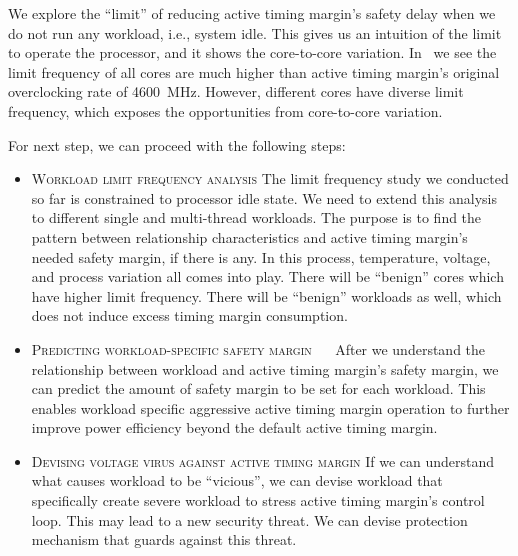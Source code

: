 We explore the ``limit'' of reducing active timing margin's safety delay when we do not run any workload, i.e., system idle. This gives us an intuition of the limit to operate the processor, and it shows the core-to-core variation. In~ we see the limit frequency of all cores are much higher than active timing margin's original overclocking rate of 4600~MHz. However, different cores have diverse limit frequency, which exposes the opportunities from core-to-core variation.

For next step, we can proceed with the following steps:

\begin{itemize}
  \item \textsc{Workload limit frequency analysis} The limit frequency study we conducted so far is constrained to processor idle state. We need to extend this analysis to different single and multi-thread workloads. The purpose is to find the pattern between relationship characteristics and active timing margin's needed safety margin, if there is any. In this process, temperature, voltage, and process variation all comes into play. There will be ``benign'' cores which have higher limit frequency. There will be ``benign'' workloads as well, which does not induce excess timing margin consumption.
    
  \item \textsc{Predicting workload-specific safety margin ~~} After we understand the relationship between workload and active timing margin's safety margin, we can predict the amount of safety margin to be set for each workload. This enables workload specific aggressive active timing margin operation to further improve power efficiency beyond the default active timing margin.
    
  \item \textsc{Devising voltage virus against active timing margin} If we can understand what causes workload to be ``vicious'', we can devise workload that specifically create severe workload to stress active timing margin's control loop. This may lead to a new security threat. We can devise protection mechanism that guards against this threat.
  
\end{itemize}

